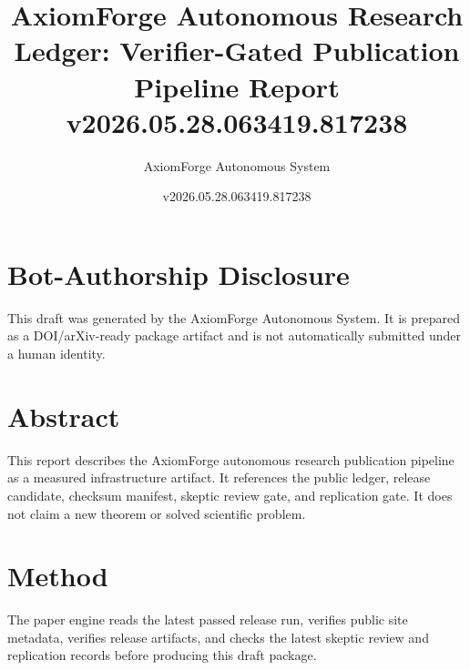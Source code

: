 \documentclass[11pt]{article}
\title{AxiomForge Autonomous Research Ledger: Verifier-Gated Publication Pipeline Report v2026.05.28.063419.817238}
\author{AxiomForge Autonomous System}
\date{v2026.05.28.063419.817238}
\begin{document}
\maketitle

\section*{Bot-Authorship Disclosure}
This draft was generated by the AxiomForge Autonomous System. It is prepared as
a DOI/arXiv-ready package artifact and is not automatically submitted under a
human identity.

\section*{Abstract}
This report describes the AxiomForge autonomous research publication pipeline
as a measured infrastructure artifact. It references the public ledger,
release candidate, checksum manifest, skeptic review gate, and replication gate.
It does not claim a new theorem or solved scientific problem.

\section*{Method}
The paper engine reads the latest passed release run, verifies public site
metadata, verifies release artifacts, and checks the latest skeptic review and
replication records before producing this draft package.
\end{document}
